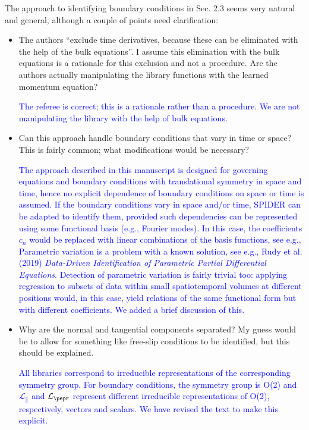 \documentclass{article}
\newcommand{\response}{\textcolor{blue}}
\begin{document}
\medskip
     The approach to identifying boundary conditions in
Sec. 2.3 seems very natural and general, although a couple of points
need clarification:
\begin{itemize}
\item The authors “exclude time derivatives, because these
can be eliminated with the help of the bulk equations”.  I assume this
elimination with the bulk equations is a rationale for this exclusion
and not a procedure.  Are the authors actually manipulating the
library functions with the learned momentum equation?

\response{The referee is correct; this is a rationale rather than a procedure. We are not manipulating the library with the help of bulk equations.}

\item Can this approach handle boundary conditions that vary
in time or space?  This is fairly common; what modifications would be necessary?

\response{
The approach described in this manuscript is designed for governing equations and boundary conditions with translational symmetry in space and time, hence no explicit dependence of boundary conditions on space or time is assumed. If the boundary conditions vary in space and/or time, SPIDER can be adapted to identify them, provided such dependencies can be represented using some functional basis (e.g., Fourier modes). In this case, the coefficients $c_n$ would be replaced with linear combinations of the basis functions, see e.g., Parametric variation is a problem with a known solution, see e.g., Rudy et al. (2019) \textit{Data-Driven Identification of Parametric Partial Differential Equations}. Detection of parametric variation is fairly trivial too: applying regression to subsets of data within small spatiotemporal volumes at different positions would, in this case, yield relations of the same functional form but with different coefficients. We added a brief discussion of this.}

\item Why are the normal and tangential components
separated?  My guess would be to allow for something like free-slip
conditions to be identified, but this should be explained.

\response{All libraries correspond to irreducible representations of the corresponding symmetry group. For boundary conditions, the symmetry group is O(2) and $\mathcal{L}_\parallel$ and $\mathcal{L}_\pepr$ represent different irreducible representations of O(2), respectively, vectors and scalars. We have revised the text to make this explicit.
}
\end{itemize}
        
\end{document}
